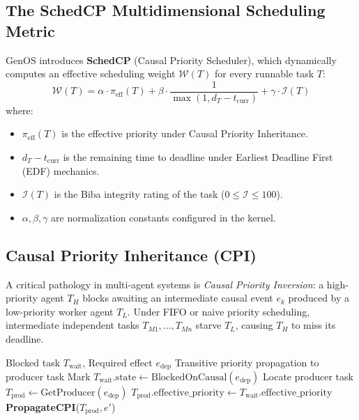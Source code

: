 \documentclass[10pt,journal,compsoc]{IEEEtran}
\theoremstyle{definition}
\begin{document}
\subsection{The SchedCP Multidimensional Scheduling Metric}
GenOS introduces \textbf{SchedCP} (Causal Priority Scheduler), which dynamically computes an effective scheduling weight $\mathcal{W}(T)$ for every runnable task $T$:
\begin{equation}
\mathcal{W}(T) = \alpha \cdot \pi_{\text{eff}}(T) + \beta \cdot \frac{1}{\max(1, d_T - t_{\text{curr}})} + \gamma \cdot \mathcal{I}(T)
\end{equation}
where:
\begin{itemize}
    \item $\pi_{\text{eff}}(T)$ is the effective priority under Causal Priority Inheritance.
    \item $d_T - t_{\text{curr}}$ is the remaining time to deadline under Earliest Deadline First (EDF) mechanics.
    \item $\mathcal{I}(T)$ is the Biba integrity rating of the task ($0 \le \mathcal{I} \le 100$).
    \item $\alpha, \beta, \gamma$ are normalization constants configured in the kernel.
\end{itemize}

\subsection{Causal Priority Inheritance (CPI)}
A critical pathology in multi-agent systems is \textit{Causal Priority Inversion}: a high-priority agent $T_H$ blocks awaiting an intermediate causal event $e_k$ produced by a low-priority worker agent $T_L$. Under FIFO or naive priority scheduling, intermediate independent tasks $T_{M1}, \dots, T_{Mn}$ starve $T_L$, causing $T_H$ to miss its deadline.

\begin{algorithm}[H]
\caption{Causal Priority Inheritance (CPI) in GenOS}
\label{alg:cpi}
\begin{algorithmic}[1]
\REQUIRE Blocked task $T_{\text{wait}}$, Required effect $e_{\text{dep}}$
\ENSURE Transitive priority propagation to producer task
\STATE Mark $T_{\text{wait}}.\text{state} \leftarrow \text{BlockedOnCausal}(e_{\text{dep}})$
\STATE Locate producer task $T_{\text{prod}} \leftarrow \text{GetProducer}(e_{\text{dep}})$
        \STATE $T_{\text{prod}}.\text{effective\_priority} \leftarrow T_{\text{wait}}.\text{effective\_priority}$
        \STATE {}
            \STATE \textbf{PropagateCPI}($T_{\text{prod}}, e'$)
        \ENDIF
    \ENDIF
\ENDIF
\end{algorithmic}
\end{algorithm}
\end{document}
